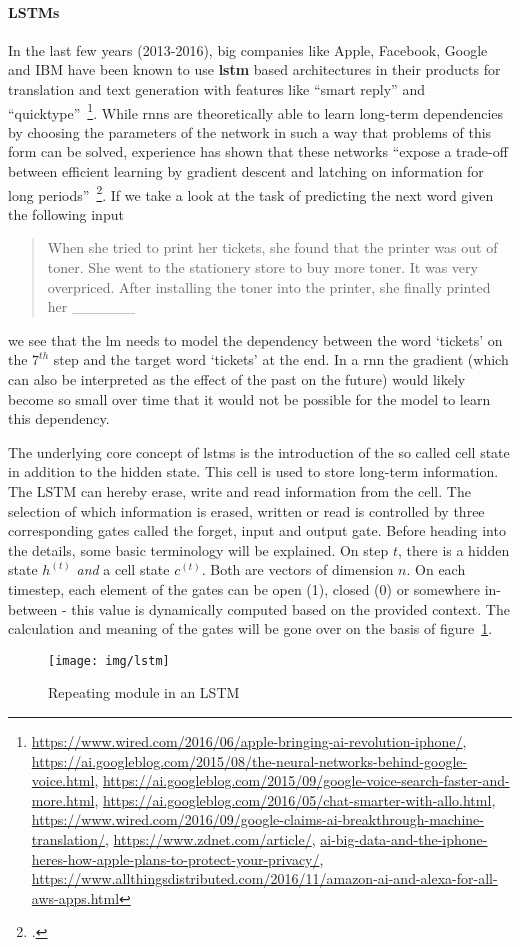 \paragraph{LSTMs}
In the last few years (2013-2016), big companies like Apple, Facebook, Google and IBM have been known to use \textbf{\gls{lstm}} based architectures in their products for translation and text generation with features like “smart reply” and “quicktype”~\footnote{\url{https://www.wired.com/2016/06/apple-bringing-ai-revolution-iphone/}, \url{https://ai.googleblog.com/2015/08/the-neural-networks-behind-google-voice.html}, \url{https://ai.googleblog.com/2015/09/google-voice-search-faster-and-more.html}, \url{https://ai.googleblog.com/2016/05/chat-smarter-with-allo.html}, \url{https://www.wired.com/2016/09/google-claims-ai-breakthrough-machine-translation/}, \url{https://www.zdnet.com/article/}, \url{ai-big-data-and-the-iphone-heres-how-apple-plans-to-protect-your-privacy/}, \url{https://www.allthingsdistributed.com/2016/11/amazon-ai-and-alexa-for-all-aws-apps.html}}. While \gls{rnn}s are theoretically able to learn long-term dependencies by choosing the parameters of the network in such a way that problems of this form can be solved, experience has shown that these networks ``expose a trade-off between efficient learning by gradient descent and latching on information for long periods''~\footcite{279181}. If we take a look at the task of predicting the next word given the following input
\begin{quote}
	When she tried to print her tickets, she found that the printer was out of toner. She went to the stationery store to buy more toner. It was very overpriced. After installing the toner into the printer, she finally printed her \_\_\_\_\_\_
\end{quote}
we see that the \gls{lm} needs to model the dependency between the word `tickets' on the $ 7^{th} $ step and the target word `tickets' at the end. In a \gls{rnn} the gradient (which can also be interpreted as the effect of the past on the future) would likely become so small over time that it would not be possible for the model to learn this dependency.

The underlying core concept of \gls{lstm}s is the introduction of the so called cell state in addition to the hidden state. This cell is used to store long-term information. The LSTM can hereby erase, write and read information from the cell. The selection of which information is erased, written or read is controlled by three corresponding gates called the forget, input and output gate. Before heading into the details, some basic terminology will be explained. On step $ t $, there is a hidden state $ h^{(t)} $ \textit{and} a cell state $ c^{(t)} $. Both are vectors of dimension $ n $. On each timestep, each element of the gates can be open (1), closed (0) or somewhere in-between - this value is dynamically computed based on the provided context. The calculation and meaning of the gates will be gone over on the basis of figure~\ref{fig:lstm_architecture}.
\begin{figure}
  	\texttt{[image: img/lstm]}
  	\caption{Repeating module in an LSTM}
	\label{fig:lstm_architecture}
\end{figure}


